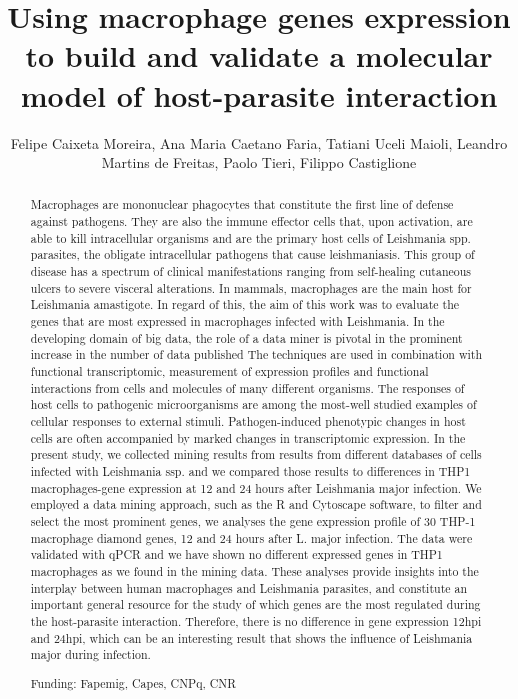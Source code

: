 \documentclass[twoside]{article}
\title{\vspace{-15mm}\fontsize{24pt}{10pt}\selectfont\textbf{ Using macrophage genes expression to build and validate a molecular model of host-parasite interaction }} %
\author{ Felipe Caixeta Moreira, Ana Maria Caetano Faria, Tatiani Uceli Maioli, Leandro Martins de Freitas, Paolo Tieri, Filippo Castiglione }
\affil{ Universidade Federal de Minas Gerais }
\date{}
\begin{document}
  
  
  \maketitle %
  
  
  \thispagestyle{fancy} %
  
  
  \begin{abstract}
  Macrophages are mononuclear phagocytes that constitute the first line of defense against pathogens. They are also the immune effector cells that,  upon activation,  are able to kill intracellular organisms and are the primary host cells of Leishmania spp. parasites,  the obligate intracellular pathogens that cause leishmaniasis. This group of disease has a spectrum of clinical manifestations ranging from self-healing cutaneous ulcers to severe visceral alterations. In mammals,  macrophages are the main host for Leishmania amastigote. In regard of this,  the aim of this work was to evaluate the genes that are most expressed in macrophages infected with Leishmania.  In the developing domain of big data,  the role of a data miner is pivotal in the prominent increase in the number of data published The techniques are used in combination with functional transcriptomic,  measurement of expression profiles and functional interactions from cells and molecules of many different organisms. The responses of host cells to pathogenic microorganisms are among the most-well studied examples of cellular responses to external stimuli. Pathogen-induced phenotypic changes in host cells are often accompanied by marked changes in transcriptomic expression. In the present study,  we collected mining results from results from different databases of cells infected with Leishmania ssp. and we compared those results to differences in THP1 macrophages-gene expression at 12 and 24 hours after Leishmania major infection. We employed a data mining approach,  such as the R and Cytoscape software,  to filter and select the most prominent genes,  we analyses the gene expression profile of 30 THP-1 macrophage diamond genes,  12 and 24 hours after L. major infection. The data were validated with qPCR and we have shown no different expressed genes in THP1 macrophages as we found in the mining data.  These analyses provide insights into the interplay between human macrophages and Leishmania parasites,  and constitute an important general resource for the study of which genes are the most regulated during the host-parasite interaction. Therefore,  there is no difference in gene expression 12hpi and 24hpi,  which can be an interesting result that shows the influence of Leishmania major during infection.
  
  Funding: Fapemig,  Capes,  CNPq,  CNR \\ 
  \end{abstract}
  
\end{document}
